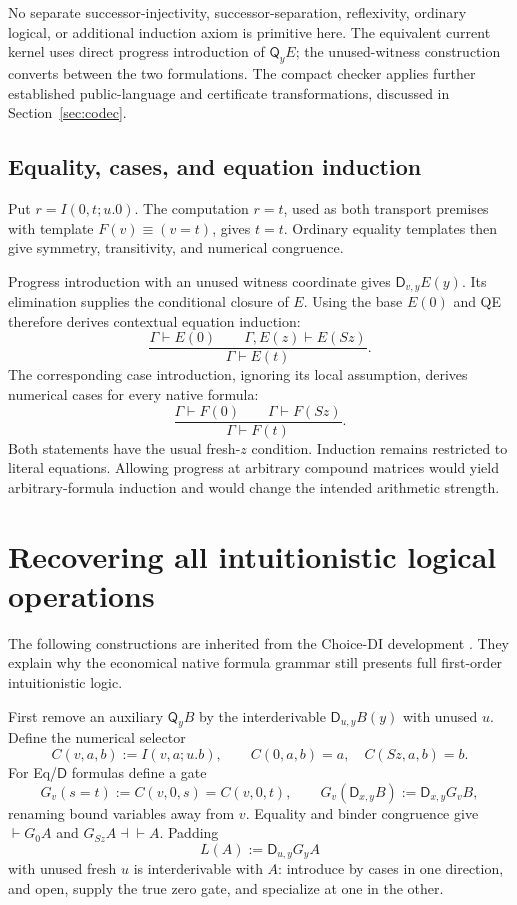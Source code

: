 \documentclass[11pt,letterpaper]{article}
\theoremstyle{definition}
\newcommand{\D}{\mathsf D}
\newcommand{\Q}{\mathsf Q}
\begin{document}
No separate successor-injectivity, successor-separation, reflexivity,
ordinary logical, or additional induction axiom is primitive here. The
equivalent current kernel uses direct progress introduction of $\Q_yE$;
the unused-witness construction converts between the two formulations.
The compact checker applies further established public-language and
certificate transformations, discussed in Section~\ref{sec:codec}.

\subsection{Equality, cases, and equation induction}
Put $r=I(0,t;u.0)$. The computation $r=t$, used as both transport premises
with template $F(v)\equiv(v=t)$, gives $t=t$. Ordinary equality templates
then give symmetry, transitivity, and numerical congruence.

Progress introduction with an unused witness coordinate gives
$\D_{v,y}E(y)$. Its elimination supplies the conditional closure of $E$.
Using the base $E(0)$ and QE therefore derives contextual equation induction:
\[
 \frac{\Gamma\vdash E(0)\qquad\Gamma,E(z)\vdash E(Sz)}
      {\Gamma\vdash E(t)}.
\]
The corresponding case introduction, ignoring its local assumption,
derives numerical cases for every native formula:
\[
 \frac{\Gamma\vdash F(0)\qquad\Gamma\vdash F(Sz)}
      {\Gamma\vdash F(t)}.
\]
Both statements have the usual fresh-$z$ condition. Induction remains
restricted to literal equations. Allowing progress at arbitrary compound
matrices would yield arbitrary-formula induction and would change the
intended arithmetic strength.

\section{Recovering all intuitionistic logical operations}
The following constructions are inherited from the Choice-DI development
\cite{choice}. They explain why the economical native formula grammar
still presents full first-order intuitionistic logic.

First remove an auxiliary $\Q_yB$ by the interderivable
$\D_{u,y}B(y)$ with unused $u$. Define the numerical selector
\[
 C(v,a,b):=I(v,a;u.b),\qquad
 C(0,a,b)=a,\quad C(Sz,a,b)=b.
\]
For Eq/$\D$ formulas define a gate
\[
 G_v(s=t):=C(v,0,s)=C(v,0,t),\qquad
 G_v(\D_{x,y}B):=\D_{x,y}G_vB,
\]
renaming bound variables away from $v$. Equality and binder congruence
give $\vdash G_0A$ and $G_{Sz}A\dashv\vdash A$. Padding
\[
 L(A):=\D_{u,y}G_yA
\]
with unused fresh $u$ is interderivable with $A$: introduce by cases in
one direction, and open, supply the true zero gate, and specialize at one
in the other.
\end{document}
